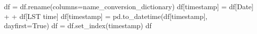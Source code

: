 \documentclass[
  letterpaper,
  DIV=11,
  numbers=noendperiod]{scrreprt}
\newenvironment{Shaded}{\begin{snugshade}}{\end{snugshade}}
\newcommand{\NormalTok}[1]{\textcolor[rgb]{0.00,0.23,0.31}{#1}}
\newcommand{\OperatorTok}[1]{\textcolor[rgb]{0.37,0.37,0.37}{#1}}
\newcommand{\StringTok}[1]{\textcolor[rgb]{0.13,0.47,0.30}{#1}}
\newcommand{\VariableTok}[1]{\textcolor[rgb]{0.07,0.07,0.07}{#1}}
\begin{document}
\begin{Shaded}
\begin{Highlighting}[]
\NormalTok{df }\OperatorTok{=}\NormalTok{ df.rename(columns}\OperatorTok{=}\NormalTok{name\_conversion\_dictionary)}
\NormalTok{df[}\StringTok{\textquotesingle{}timestamp\textquotesingle{}}\NormalTok{] }\OperatorTok{=}\NormalTok{ df[}\StringTok{\textquotesingle{}Date\textquotesingle{}}\NormalTok{] }\OperatorTok{+} \StringTok{\textquotesingle{} \textquotesingle{}} \OperatorTok{+}\NormalTok{ df[}\StringTok{\textquotesingle{}LST time\textquotesingle{}}\NormalTok{]}
\NormalTok{df[}\StringTok{\textquotesingle{}timestamp\textquotesingle{}}\NormalTok{] }\OperatorTok{=}\NormalTok{ pd.to\_datetime(df[}\StringTok{\textquotesingle{}timestamp\textquotesingle{}}\NormalTok{], dayfirst}\OperatorTok{=}\VariableTok{True}\NormalTok{)}
\NormalTok{df }\OperatorTok{=}\NormalTok{ df.set\_index(}\StringTok{\textquotesingle{}timestamp\textquotesingle{}}\NormalTok{)}
\NormalTok{df}
\end{Highlighting}
\end{Shaded}
\end{document}
